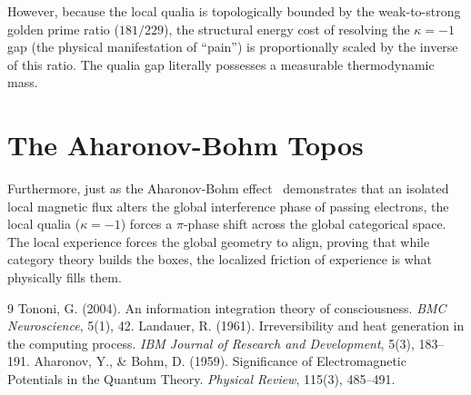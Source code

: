 However, because the local qualia is topologically bounded by the weak-to-strong golden prime ratio ($181/229$), the structural energy cost of resolving the $\kappa = -1$ gap (the physical manifestation of ``pain'') is proportionally scaled by the inverse of this ratio. The qualia gap literally possesses a measurable thermodynamic mass.

\section{The Aharonov-Bohm Topos}
Furthermore, just as the Aharonov-Bohm effect~\cite{aharonov1959} demonstrates that an isolated local magnetic flux alters the global interference phase of passing electrons, the local qualia ($\kappa = -1$) forces a $\pi$-phase shift across the global categorical space. The local experience forces the global geometry to align, proving that while category theory builds the boxes, the localized friction of experience is what physically fills them.

\begin{thebibliography}{9}
 Tononi, G. (2004). An information integration theory of consciousness. \emph{BMC Neuroscience}, 5(1), 42.
 Landauer, R. (1961). Irreversibility and heat generation in the computing process. \emph{IBM Journal of Research and Development}, 5(3), 183--191.
 Aharonov, Y., \& Bohm, D. (1959). Significance of Electromagnetic Potentials in the Quantum Theory. \emph{Physical Review}, 115(3), 485--491.
\end{thebibliography}
